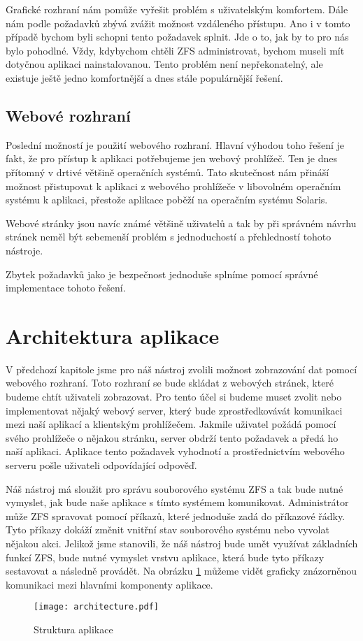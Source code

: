     Grafické rozhraní nám pomůže vyřešit problém s uživatelským komfortem. Dále nám podle požadavků zbývá zvážit možnost vzdáleného přístupu. Ano i v tomto případě bychom byli schopni tento požadavek splnit. Jde o to, jak by to pro nás bylo pohodlné. Vždy, kdybychom chtěli ZFS administrovat, bychom museli mít dotyčnou aplikaci nainstalovanou. Tento problém není nepřekonatelný, ale existuje ještě jedno komfortnější a dnes stále populárnější řešení.
    \subsection{Webové rozhraní}
    Poslední možností je použití webového rozhraní. Hlavní výhodou toho řešení je fakt, že pro přístup k aplikaci potřebujeme jen webový prohlížeč. Ten je dnes přítomný v drtivé většině operačních systémů. Tato skutečnost nám přináší možnost přistupovat k aplikaci z webového prohlížeče v libovolném operačním systému k aplikaci, přestože aplikace poběží na operačním systému Solaris.

    Webové stránky jsou navíc známé většině uživatelů a tak by při správném návrhu stránek neměl být sebemenší problém s jednoduchostí a přehledností tohoto nástroje.

    Zbytek požadavků jako je bezpečnost jednoduše splníme pomocí správné implementace tohoto řešení.
\section{Architektura aplikace}
V předchozí kapitole jsme pro náš nástroj zvolili možnost zobrazování dat pomocí webového rozhraní. Toto rozhraní se bude skládat z webových stránek, které budeme chtít uživateli zobrazovat. Pro tento účel si budeme muset zvolit nebo implementovat nějaký webový server, který bude zprostředkovávát komunikaci mezi naší aplikací a klientským prohlížečem. Jakmile uživatel požádá pomocí svého prohlížeče o nějakou stránku, server obdrží tento požadavek a předá ho naší aplikaci. Aplikace tento požadavek vyhodnotí a prostřednictvím webového serveru pošle uživateli odpovídající odpověď.

Náš nástroj má sloužit pro správu souborového systému ZFS a tak bude nutné vymyslet, jak bude naše aplikace s tímto systémem komunikovat. Administrátor může ZFS spravovat pomocí příkazů, které jednoduše zadá do příkazové řádky. Tyto příkazy dokáží změnit vnitřní stav souborového systému nebo vyvolat nějakou akci. Jelikož jsme stanovili, že náš nástroj bude umět využívat základních funkcí ZFS, bude nutné vymyslet vrstvu aplikace, která bude tyto příkazy sestavovat a následně provádět. Na obrázku \ref{architecture} můžeme vidět graficky znázorněnou komunikaci mezi hlavními komponenty aplikace.
\begin{figure}[h]
        \caption{Struktura aplikace}
        \label{architecture}
        \centering
        \texttt{[image: architecture.pdf]}
\end{figure}
